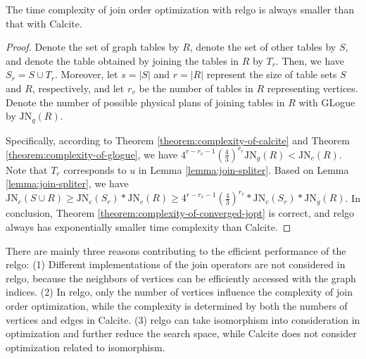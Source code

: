 \begin{theorem}
    \label{theorem:complexity-of-converged-jopt}
    The time complexity of join order optimization with relgo is always smaller than that with Calcite.
\end{theorem}
\begin{proof}
    Denote the set of graph tables by $R$, denote the set of other tables by $S$, and denote the table obtained by joining the tables in $R$ by $T_r$.
    Then, we have $S_r = S \cup T_r$.
    Moreover, let $s = |S|$ and $r = |R|$ represent the size of table sets $S$ and $R$, respectively, and let $r_v$ be the number of tables in $R$ representing vertices.
    Denote the number of possible physical plans of joining tables in $R$ with GLogue by $\text{JN}_g(R)$.
    
    Specifically, according to Theorem \ref{theorem:complexity-of-calcite} and Theorem \ref{theorem:complexity-of-glogue}, we have $4^{r - r_v -1}(\frac{4}{3})^{r_v}\text{JN}_g(R) < \text{JN}_c(R)$.
    Note that $T_r$ corresponds to $u$ in Lemma \ref{lemma:join-spliter}.
    Based on Lemma \ref{lemma:join-spliter}, we have $\text{JN}_c(S \cup R) \geq \text{JN}_c(S_r) * \text{JN}_c(R) \geq 4^{r - r_v -1}(\frac{4}{3})^{r_v} * \text{JN}_c(S_r) * \text{JN}_g(R)$.
    In conclusion, Theorem \ref{theorem:complexity-of-converged-jopt} is correct, and relgo always has exponentially smaller time complexity than Calcite.
\end{proof}

There are mainly three reasons contributing to the efficient performance of the relgo:
(1) Different implementations of the join operators are not considered in relgo, because the neighbors of vertices can be efficiently accessed with the graph indices.
(2) In relgo, only the number of vertices influence the complexity of join order optimization, while the complexity is determined by both the numbers of vertices and edges in Calcite.
(3) relgo can take isomorphism into consideration in optimization and further reduce the search space, while Calcite does not consider optimization related to isomorphism.
